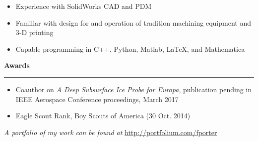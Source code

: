 \documentclass[12pt, oneside]{article}
\newcommand{\headingstyleSJobs}[1] {
	{\fontsize{20pt}{1em}\selectfont \bf \textcolor{new_red}{#1}}
	\textcolor{new_red}{\rule{3.25in}{0.5pt}} \vspace{-10pt}
}
\begin{document}
\begin{flushleft}
\begin{itemize}
	\item Experience with SolidWorks CAD and PDM \\
	\item Familiar with design for and operation of tradition machining equipment and 3-D printing
	\item Capable programming in C++, Python, Matlab, \LaTeX, and Mathematica \\
\end{itemize}


\headingstyleSJobs{Awards}

\begin{itemize}
	\item Coauthor on \textit{A Deep Subsurface Ice Probe for Europa}, publication pending in IEEE Aerospace Conference proceedings, March 2017
	\item Eagle Scout Rank, Boy Scouts of America (30 Oct. 2014)
\end{itemize}

\textit{A portfolio of my work can be found at} \url{http://portfolium.com/fporter}

\end{flushleft}
\end{document}
